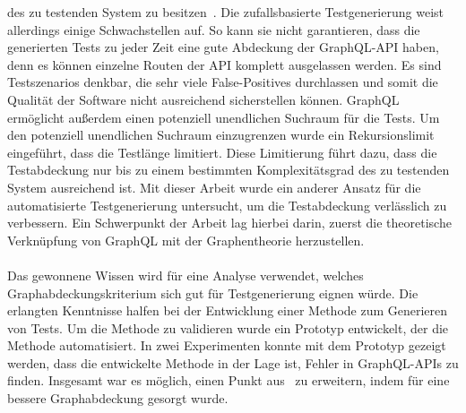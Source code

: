 des zu testenden System zu besitzen~\cite[vgl. Proposed Method]{property-based-testing}.
Die zufallsbasierte Testgenerierung weist allerdings einige Schwachstellen auf.
So kann sie nicht garantieren, dass die generierten Tests zu jeder Zeit eine gute Abdeckung der GraphQL-API haben, denn es können einzelne Routen der API
komplett ausgelassen werden.
Es sind Testszenarios denkbar, die sehr viele False-Positives durchlassen und somit die Qualität der Software nicht ausreichend sicherstellen können.
GraphQL ermöglicht außerdem einen potenziell unendlichen Suchraum für die Tests.
Um den potenziell unendlichen Suchraum einzugrenzen wurde ein Rekursionslimit eingeführt, dass die Testlänge limitiert.
Diese Limitierung führt dazu, dass die Testabdeckung nur bis zu einem bestimmten Komplexitätsgrad des zu testenden System ausreichend ist.
Mit dieser Arbeit wurde ein anderer Ansatz für die automatisierte Testgenerierung untersucht, um die Testabdeckung verlässlich zu verbessern.
Ein Schwerpunkt der Arbeit lag hierbei darin, zuerst die theoretische Verknüpfung von GraphQL mit der Graphentheorie herzustellen.
\\
\\
Das gewonnene Wissen wird für eine Analyse verwendet, welches Graphabdeckungskriterium sich gut für Testgenerierung eignen würde.
Die erlangten Kenntnisse halfen bei der Entwicklung einer Methode zum Generieren von Tests.
Um die Methode zu validieren wurde ein Prototyp entwickelt, der die Methode automatisiert.
In zwei Experimenten konnte mit dem Prototyp gezeigt werden, dass die entwickelte Methode in der Lage ist, Fehler in GraphQL-APIs zu finden.
Insgesamt war es möglich, einen Punkt aus~\cite[VI. Future Work]{property-based-testing} zu erweitern, indem für eine bessere Graphabdeckung gesorgt wurde.
